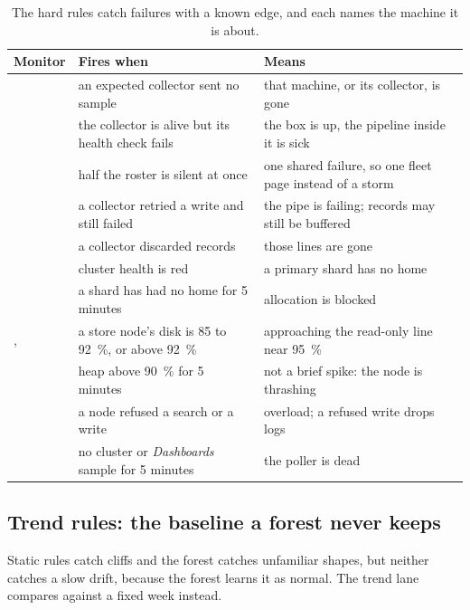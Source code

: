 \begin{table}[htbp]\caption{The hard rules catch failures with a known edge, and each names the machine it is about.}\label{tab:hardrules}\centering\footnotesize
\begin{tabularx}{\textwidth}{L{0.22\textwidth} Y Y}
\toprule
Monitor & Fires when & Means \\
\midrule
{} & an expected collector sent no sample & that machine, or its collector, is gone \\
 & the collector is alive but its health check fails & the box is up, the pipeline inside it is sick \\
 & half the roster is silent at once & one shared failure, so one fleet page instead of a storm \\
 & a collector retried a write and still failed & the pipe is failing; records may still be buffered \\
 & a collector discarded records & those lines are gone \\
 & cluster health is red & a primary shard has no home \\
 & a shard has had no home for 5 minutes & allocation is blocked \\
,  & a store node's disk is 85 to 92~\%, or above 92~\% & approaching the read-only line near 95~\% \\
 & heap above 90~\% for 5 minutes & not a brief spike: the node is thrashing \\
 & a node refused a search or a write & overload; a refused write drops logs \\
 & no cluster or \textit{Dashboards} sample for 5 minutes & the poller is dead \\
\bottomrule
\end{tabularx}
\end{table}

\subsection{Trend rules: the baseline a forest never keeps}\label{sec:metrics-trend}

Static rules catch cliffs and the forest catches unfamiliar shapes, but neither catches a slow drift, because the forest learns it as normal. The trend lane compares against a fixed week instead.


